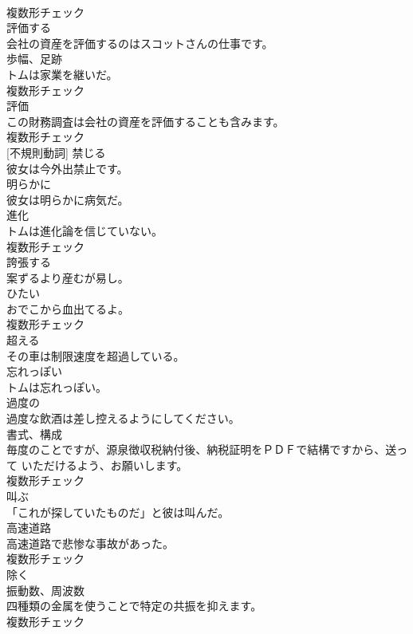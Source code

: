 \documentclass[8pt]{extreport}
\begin{document}
\begin{CJK}{UTF8}{min}
\\	複数形チェック
\\	[動詞]	評価する	
\\	会社の資産を評価するのはスコットさんの仕事です。	
\\	[名詞]	歩幅、足跡	
\\	トムは家業を継いだ。	
\\	複数形チェック
\\	[名詞]	評価	
\\	この財務調査は会社の資産を評価することも含みます。	
\\	複数形チェック
\\	[動詞] [不規則動詞]	禁じる	
\\	彼女は今外出禁止です。	
\\	[副詞]	明らかに	
\\	彼女は明らかに病気だ。	
\\	[名詞]	進化	
\\	トムは進化論を信じていない。	
\\	複数形チェック
\\	[動詞]	誇張する	
\\	案ずるより産むが易し。	
\\	[名詞]	ひたい	
\\	おでこから血出てるよ。	
\\	複数形チェック
\\	[動詞]	超える	
\\	その車は制限速度を超過している。	
\\	[形容詞]	忘れっぽい	
\\	トムは忘れっぽい。	
\\	[形容詞]	過度の	
\\	過度な飲酒は差し控えるようにしてください。	
\\	[名詞]	書式、構成	
\\	毎度のことですが、源泉徴収税納付後、納税証明をＰＤＦで結構ですから、送って いただけるよう、お願いします。	
\\	複数形チェック
\\	[動詞]	叫ぶ	
\\	「これが探していたものだ」と彼は叫んだ。	
\\	[名詞]	高速道路	
\\	高速道路で悲惨な事故があった。	
\\	複数形チェック
\\	[動詞]	除く	
\\	[名詞]	振動数、周波数	
\\	四種類の金属を使うことで特定の共振を抑えます。	
\\	複数形チェック

\end{CJK}
\end{document}
